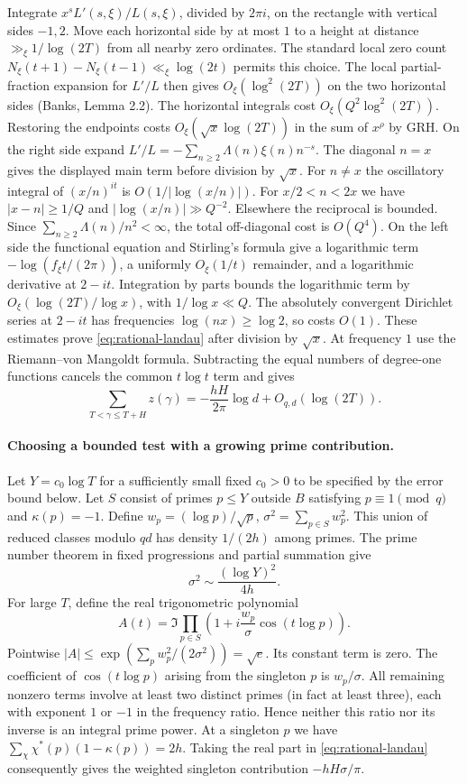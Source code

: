 Integrate $x^s L'(s,\xi)/L(s,\xi)$, divided by $2\pi i$, on the
rectangle with vertical sides $-1,2$. Move each horizontal side by
at most $1$ to a height at distance $\gg_\xi 1/\log(2T)$ from all
nearby zero ordinates. The standard local zero count
$N_\xi(t+1)-N_\xi(t-1)\ll_\xi\log(2t)$ permits this choice.
The local partial-fraction expansion for $L'/L$ then gives
$O_\xi(\log^2(2T))$ on the two horizontal sides (Banks, Lemma 2.2).
The horizontal integrals cost $O_\xi(Q^2\log^2(2T))$. Restoring the
endpoints costs $O_\xi(\sqrt{x}\log(2T))$ in the sum of $x^\rho$ by
GRH. On the right side expand $L'/L=-\sum_{n\ge2}\Lambda(n)\xi(n)n^{-s}$.
The diagonal $n=x$ gives the displayed main term before division by
$\sqrt{x}$. For $n\ne x$ the oscillatory integral of $(x/n)^{it}$ is
$O(1/|\log(x/n)|)$. For $x/2<n<2x$ we have $|x-n|\ge1/Q$ and
$|\log(x/n)|\gg Q^{-2}$. Elsewhere the reciprocal is bounded. Since
$\sum_{n\ge2}\Lambda(n)/n^2<\infty$, the total off-diagonal cost is
$O(Q^4)$. On the left side the functional equation and Stirling's
formula give a logarithmic term $-\log(f_\xi t/(2\pi))$, a uniformly
$O_\xi(1/t)$ remainder, and a logarithmic derivative at $2-it$.
Integration by parts bounds the logarithmic term by
$O_\xi(\log(2T)/\log x)$, with $1/\log x\ll Q$. The absolutely
convergent Dirichlet series at $2-it$ has frequencies $\log(nx)\ge
\log 2$, so costs $O(1)$. These estimates prove
\eqref{eq:rational-landau} after division by $\sqrt{x}$. At frequency
$1$ use the Riemann--von Mangoldt formula. Subtracting the equal numbers
of degree-one functions cancels the common $t\log t$ term and gives
\begin{equation}
  \sum_{T<\gamma\le T+H} z(\gamma)
    =-\frac{hH}{2\pi}\log d+O_{q,d}(\log(2T)).
 \label{eq:conductordifference}
\end{equation}

\paragraph{Choosing a bounded test with a growing prime contribution.}
Let $Y=c_0\log T$ for a sufficiently small fixed $c_0>0$ to be specified
by the error bound below. Let $S$ consist of primes $p\le Y$ outside
$B$ satisfying $p\equiv1\pmod q$ and $\kappa(p)=-1$.
Define $w_p=(\log p)/\sqrt p$, $\sigma^2=\sum_{p\in S}w_p^2$.
This union of reduced classes modulo $qd$ has density $1/(2h)$ among
primes. The prime number theorem in fixed progressions and partial
summation give
\[
 \sigma^2\sim\frac{(\log Y)^2}{4h}.
\]
For large $T$, define the real trigonometric polynomial
\[
 A(t)=\Im\prod_{p\in S}
       \left(1+i\frac{w_p}{\sigma}\cos(t\log p)\right).
\]
Pointwise $|A|\le\exp(\sum_p w_p^2/(2\sigma^2))=\sqrt e$.
Its constant term is zero. The coefficient of
$\cos(t\log p)$ arising from the singleton $p$ is $w_p/\sigma$.
All remaining nonzero terms involve at least two distinct primes
(in fact at least three), each with exponent $1$ or $-1$ in the
frequency ratio. Hence neither this ratio nor its inverse is an integral
prime power. At a singleton $p$ we have
$\sum_\chi\chi^*(p)(1-\kappa(p))=2h$.
Taking the real part in \eqref{eq:rational-landau} consequently gives the
weighted singleton contribution $-hH\sigma/\pi$.

